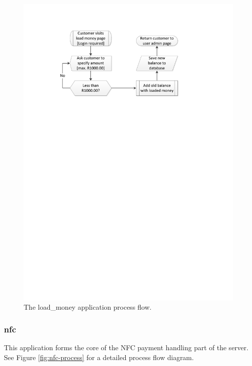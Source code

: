 \begin{figure}
 \centering 
 \includegraphics[clip=true, trim = 0 580 100 60,
 scale=0.7]{load_money}
 \caption{The load\_money application process flow.}
 \label{fig:load-money}
\end{figure}

\subsubsection{nfc}
\label{sec:app-nfc}

This application forms the core of the NFC payment handling part of the server. See Figure
\ref{fig:nfc-process} for a detailed process flow diagram.

